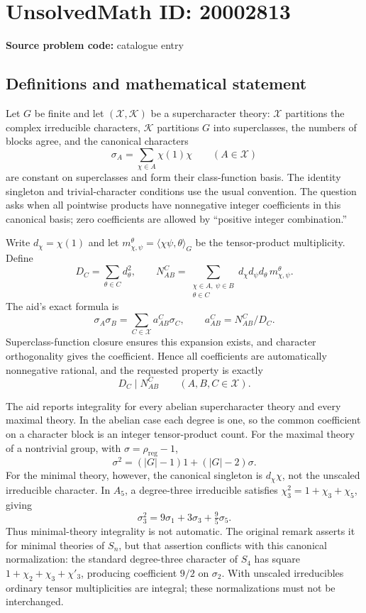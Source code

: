 \documentclass[11pt]{article}
\begin{document}
\section*{UnsolvedMath ID: 20002813}
\textbf{Source problem code:} catalogue entry
\subsection{Definitions and mathematical statement}
Let $G$ be finite and let $(\mathcal X,\mathcal K)$ be a supercharacter theory: $\mathcal X$ partitions the complex irreducible characters, $\mathcal K$ partitions $G$ into superclasses, the numbers of blocks agree, and the canonical characters
\[
 \sigma_A=\sum_{\chi\in A}\chi(1)\chi\qquad(A\in\mathcal X)
\]
are constant on superclasses and form their class-function basis. The identity singleton and trivial-character conditions use the usual convention. The question asks when all pointwise products have nonnegative integer coefficients in this canonical basis; zero coefficients are allowed by ``positive integer combination.''

Write $d_\chi=\chi(1)$ and let $m_{\chi,\psi}^{\theta}=\langle\chi\psi,\theta\rangle_G$ be the tensor-product multiplicity. Define
\[
 D_C=\sum_{\theta\in C}d_\theta^2,\qquad
 N_{AB}^{C}=\sum_{\substack{\chi\in A,\ \psi\in B\\\theta\in C}}
          d_\chi d_\psi d_\theta\,m_{\chi,\psi}^{\theta}.
\]
The aid's exact formula is
\[
 \sigma_A\sigma_B=\sum_{C\in\mathcal X}a_{AB}^{C}\sigma_C,
 \qquad a_{AB}^{C}=N_{AB}^{C}/D_C.
\]
Superclass-function closure ensures this expansion exists, and character orthogonality gives the coefficient. Hence all coefficients are automatically nonnegative rational, and the requested property is exactly
\[
 D_C\mid N_{AB}^{C}\qquad(A,B,C\in\mathcal X).
\]

The aid reports integrality for every abelian supercharacter theory and every maximal theory. In the abelian case each degree is one, so the common coefficient on a character block is an integer tensor-product count. For the maximal theory of a nontrivial group, with $\sigma=\rho_{\mathrm{reg}}-1$,
\[
 \sigma^2=(|G|-1)1+(|G|-2)\sigma.
\]
For the minimal theory, however, the canonical singleton is $d_\chi\chi$, not the unscaled irreducible character. In $A_5$, a degree-three irreducible satisfies $\chi_3^2=1+\chi_3+\chi_5$, giving
\[
 \sigma_3^2=9\sigma_1+3\sigma_3+\tfrac95\sigma_5.
\]
Thus minimal-theory integrality is not automatic. The original remark asserts it for minimal theories of $S_n$, but that assertion conflicts with this canonical normalization: the standard degree-three character of $S_4$ has square $1+\chi_2+\chi_3+\chi'_3$, producing coefficient $9/2$ on $\sigma_2$. With unscaled irreducibles ordinary tensor multiplicities are integral; these normalizations must not be interchanged.
\end{document}
